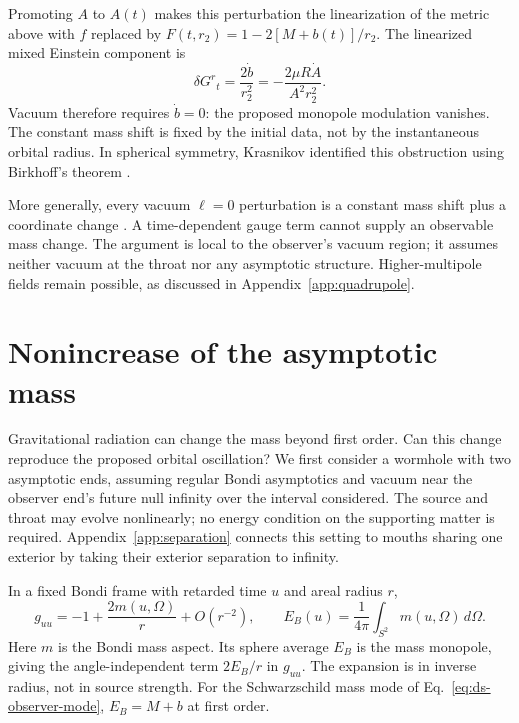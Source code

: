 \documentclass[aps,prd,10pt,onecolumn,nofootinbib,superscriptaddress,floatfix]{revtex4-2}
\begin{document}
\begin{samepage}
Promoting $A$ to $A(t)$ makes this perturbation the linearization of
the metric above with $f$ replaced by
$F(t,r_2)=1-2[M+b(t)]/r_2$.  The linearized mixed Einstein component is
\begin{equation}
 \delta G^r{}_t=\frac{2\dot b}{r_2^2}
 =-\frac{2\mu R\dot A}{A^2r_2^2}.
 \label{eq:momentum-constraint}
\end{equation}
Vacuum therefore requires $\dot b=0$: the proposed monopole modulation
vanishes.  The constant mass shift is fixed by the initial data, not by
the instantaneous orbital radius.
In spherical symmetry, Krasnikov identified this obstruction using
Birkhoff's theorem \cite{Krasnikov2020CommentObserving}.
\end{samepage}

More generally, every vacuum
$\ell=0$ perturbation is a constant mass shift plus a coordinate change
\cite{MartelPoisson2005SchwarzschildPerturbations}.
A time-dependent gauge term cannot supply an observable mass change.
The argument is local to the observer's vacuum region; it assumes
neither vacuum at the throat nor any asymptotic structure.
Higher-multipole fields remain possible, as discussed in
Appendix~\ref{app:quadrupole}.

\section{Nonincrease of the asymptotic mass}
\label{sec:nonlinear}

Gravitational radiation can change the mass beyond first order.  Can this
change reproduce the proposed orbital oscillation?  We first consider a
wormhole with two asymptotic ends, assuming regular Bondi asymptotics and
vacuum near the observer end's future null infinity over the interval
considered.  The source and throat may evolve nonlinearly; no energy
condition on the supporting matter is required.
Appendix~\ref{app:separation} connects this setting to mouths sharing one
exterior by taking their exterior separation to infinity.

In a fixed Bondi
frame with retarded time $u$ and areal radius $r$,
\begin{equation}
 g_{uu}=-1+\frac{2m(u,\Omega)}{r}+O(r^{-2}),\qquad
 E_B(u)=\frac{1}{4\pi}\int_{S^2}m(u,\Omega)\,d\Omega.
 \label{eq:bondi-monopole}
\end{equation}
Here $m$ is the Bondi mass aspect.  Its sphere average $E_B$ is the
mass monopole, giving the angle-independent term $2E_B/r$ in $g_{uu}$.
The expansion is in inverse radius, not in source strength.
For the Schwarzschild mass mode of
Eq.~\eqref{eq:ds-observer-mode}, $E_B=M+b$ at first order.
\end{document}
